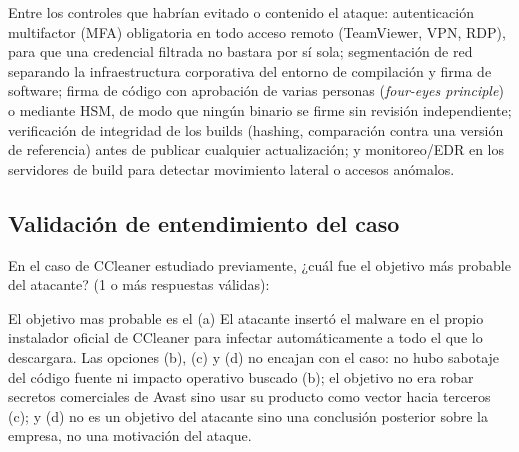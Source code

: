 \begin{respuesta}
  Entre los controles que habrían evitado o contenido el ataque: autenticación
  multifactor (MFA) obligatoria en todo acceso remoto (TeamViewer, VPN, RDP), para
  que una credencial filtrada no bastara por sí sola; segmentación de red separando
  la infraestructura corporativa del entorno de compilación y firma de software;
  firma de código con aprobación de varias personas (\emph{four-eyes principle}) o
  mediante HSM, de modo que ningún binario se firme sin revisión independiente;
  verificación de integridad de los builds (hashing, comparación contra una versión
  de referencia) antes de publicar cualquier actualización; y monitoreo/EDR en los
  servidores de build para detectar movimiento lateral o accesos anómalos.
\end{respuesta}

\subsection*{Validación de entendimiento del caso}

\begin{mcq}{En el caso de CCleaner estudiado previamente, ¿cuál fue el objetivo más
  probable del atacante? (1 o más respuestas válidas):}
\end{mcq}
\begin{respuesta}
El objetivo mas probable es el (a){
  El atacante insertó el malware en el propio instalador oficial de CCleaner para infectar automáticamente a todo el que lo descargara. Las opciones (b), (c) y (d) no encajan con el caso: no hubo sabotaje del código fuente ni impacto operativo buscado (b); el objetivo no era robar secretos comerciales de Avast sino usar su producto como vector hacia terceros (c); y (d) no es un objetivo del atacante sino una conclusión posterior sobre la empresa, no una motivación del ataque.%
}
\end{respuesta}


